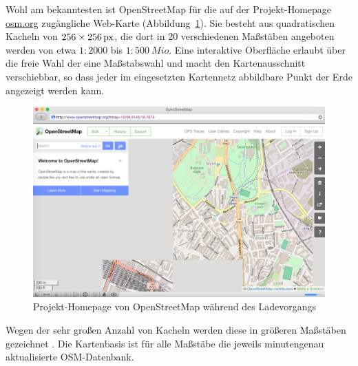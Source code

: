 \documentclass[../main/thesis.tex]{subfiles}
\begin{document}
Wohl am bekanntesten ist OpenStreetMap für die auf der Projekt-Homepage \url{osm.org} zugängliche Web-Karte (Abbildung~\ref{fig:osm.org}).
Sie besteht aus quadratischen Kacheln  von $256\times\unit[256]{px}$, die dort in 20 verschiedenen Maßstäben angeboten werden von etwa $1 \colon 2000$ bis $1 \colon 500~\unit{Mio.}$ 
Eine interaktive Oberfläche erlaubt über die freie Wahl der  eine Maßstabswahl und macht den Kartenausschnitt verschiebbar, so dass jeder im eingesetzten Kartennetz abbildbare Punkt der Erde angezeigt werden kann.
\noref %


\begin{figure}[ht]
    \centering
    \includegraphics[width=\ScaleIfNeeded]{../chapter2/osm-org}
    \caption{Projekt-Homepage von OpenStreetMap während des Ladevorgangs}\label{fig:osm.org}
\end{figure}

Wegen der sehr großen Anzahl von Kacheln werden diese in größeren Maßstäben  gezeichnet \noref.
Die Kartenbasis ist für alle Maßstäbe die jeweils minutengenau aktualisierte OSM-Datenbank. \noref %
\end{document}
